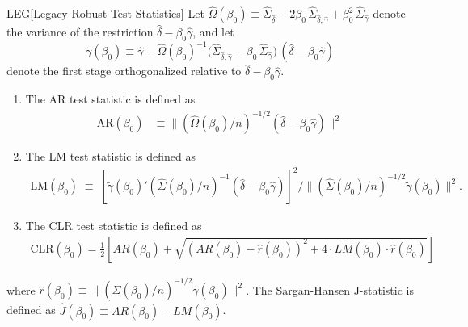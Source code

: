 \begin{definitionp}{LEG}[Legacy Robust Test Statistics]\label{def:leg}
Let \(\hat\Omega(\beta_0) \equiv \hat\Sigma_{\hat\delta} - 2\beta_0\,\hat\Sigma_{\hat\delta,\hat\gamma} + \beta_0^2\,\hat\Sigma_{\hat\gamma}\) denote the variance of the restriction \(\hat \delta - \beta_0 \hat \gamma\), and let
\[\tilde\gamma(\beta_0) \equiv \hat\gamma - \hat\Omega(\beta_0) ^{-1}\bigl(\hat\Sigma_{\hat\delta,\hat\gamma} - \beta_0\,\hat\Sigma_{\hat\gamma}\bigr)\,(\hat\delta - \beta_0\hat\gamma)\] denote the first stage orthogonalized relative to \(\hat \delta - \beta_0 \hat \gamma\).
    \begin{enumerate}
        \item
        The AR test statistic is defined as
        \begin{align}
        \mathrm{AR}(\beta_0) &\equiv \bigl\lVert (\hat\Omega(\beta_0)/n)^{-1/2}(\hat\delta - \beta_0\hat\gamma)\bigr\rVert^2
        \end{align}
        \item
        The LM test statistic is defined as
        \begin{align}
        \mathrm{LM}(\beta_0) \;\equiv\; {\left[\tilde\gamma(\beta_0)'(\hat\Sigma(\beta_0)/n)^{-1}(\hat\delta - \beta_0\hat\gamma)\right]^2}\bigg/{\bigl\lVert(\hat\Sigma(\beta_0)/n)^{-1/2}\tilde\gamma(\beta_0)\bigr\rVert^2}.
        \end{align}
        \item
        The CLR test statistic is defined as
        \begin{align}
        \mathrm{CLR}(\beta_0) = \frac{1}{2}\left[AR(\beta_0) + \sqrt{(AR(\beta_0)-\hat r(\beta_0))^2 + 4 \cdot LM(\beta_0) \cdot \hat r(\beta_0)} \right]
    \end{align}
    \end{enumerate}
    \noindent
     where \(\hat r(\beta_0) \equiv \bigl\lVert(\hat\Sigma(\beta_0)/n)^{-1/2}\tilde\gamma(\beta_0)\bigr\rVert^2\). The Sargan-Hansen J-statistic is defined as \(\hat J(\beta_0)\equiv AR(\beta_0)- LM(\beta_0)\).
\end{definitionp}
